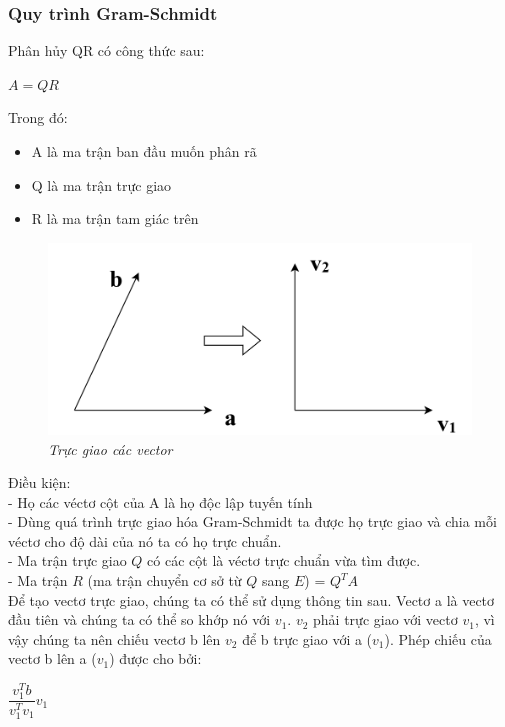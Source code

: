 \subsubsection{Quy trình Gram-Schmidt}
Phân hủy QR có công thức sau: \\
\begin{center}
	$A=QR$
\end{center}
Trong đó:
\begin{itemize}
	\item A là ma trận ban đầu muốn phân rã
	\item Q là ma trận trực giao
	\item R là ma trận tam giác trên 
\end{itemize}
\begin{figure}[!ht]
	\centering
	\includegraphics[scale=0.33]{dk}
	\caption{\textit{Trực giao các vector}}\label{fig:Picture}
\end{figure}
Điều kiện:\\
- Họ các véctơ cột của A là họ độc lập tuyến tính\\
- Dùng quá trình trực giao hóa Gram-Schmidt ta được họ trực giao và chia mỗi véctơ cho độ dài của nó ta có họ trực chuẩn. \\
- Ma trận trực giao $Q$ có các cột là véctơ trực chuẩn vừa tìm được. \\
- Ma trận $R$ (ma trận chuyển cơ sở từ $Q$ sang $E$) = $Q^{T}A$\\
Để tạo vectơ trực giao, chúng ta có thể sử dụng thông tin sau. Vectơ a là vectơ đầu tiên
và chúng ta có thể so khớp nó với $v_1$. $v_2$ phải trực giao với vectơ $v_1$, vì vậy chúng ta 
nên chiếu vectơ b lên $v_2$ để b trực giao với a ($v_1$). Phép chiếu của vectơ b lên a ($v_1$) 
được cho bởi:\\
\begin{center}
	$\dfrac{v_1^{T}b}{v_1^{T}v_1}v_1$
\end{center}

